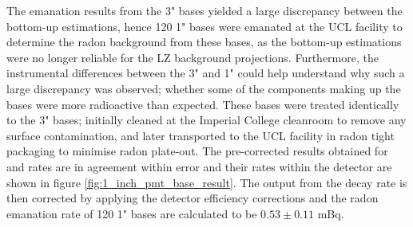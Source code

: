 The emanation results from the 3" bases yielded a large discrepancy between the bottom-up estimations, hence 120 1" bases were emanated at the UCL facility to determine the radon background from these bases, as the bottom-up estimations were no longer reliable for the LZ background projections. Furthermore, the instrumental differences between the 3" and 1" could help understand why such a large discrepancy was observed; whether some of the components making up the bases were more radioactive than expected. These bases were treated identically to the 3" bases; initially cleaned at the Imperial College cleanroom to remove any surface contamination, and later transported to the UCL facility in radon tight packaging to minimise radon plate-out. The pre-corrected results obtained for \PoTOF{} and \PoTOE{} rates are in agreement within error and their rates within the detector are shown in figure \ref{fig:1_inch_pmt_base_result}. The output from the \PoTOF{} decay rate is then corrected by applying the detector efficiency corrections and the radon emanation rate of 120 1" bases are calculated to be $0.53\pm0.11$ mBq. 
%
